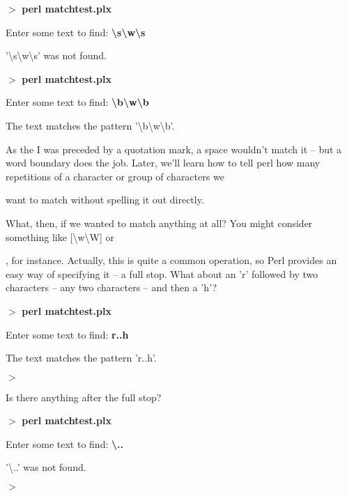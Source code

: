 \documentclass[a4paper,11pt]{book}
\begin{document}
\noindent 

\noindent $>$ \textbf{perl matchtest.plx}

\noindent Enter some text to find: \textbf{\textbackslash s\textbackslash w\textbackslash s}

\noindent '\textbackslash s\textbackslash w\textbackslash s' was not found.

\noindent 

\noindent $>$ \textbf{perl matchtest.plx}

\noindent Enter some text to find: \textbf{\textbackslash b\textbackslash w\textbackslash b}

\noindent The text matches the pattern '\textbackslash b\textbackslash w\textbackslash b'.

\noindent 

\noindent As the I was preceded by a quotation mark, a space wouldn't match it -- but a word boundary does the job. Later, we'll learn how to tell perl how many repetitions of a character or group of characters we

\noindent want to match without spelling it out directly.

\noindent 

\noindent What, then, if we wanted to match anything at all? You might consider something like [\textbackslash w\textbackslash W] or

, for instance. Actually, this is quite a common operation, so Perl provides an easy way of specifying it -- a full stop. What about an 'r' followed by two characters -- any two characters -- and then a 'h'?

\noindent 

\noindent $>$ \textbf{perl matchtest.plx}

\noindent Enter some text to find: \textbf{r..h}

\noindent The text matches the pattern 'r..h'.

\noindent $>$

\noindent 

\noindent Is there anything after the full stop?

\noindent $>$ \textbf{perl matchtest.plx}

\noindent Enter some text to find: \textbf{\textbackslash ..}

\noindent '\textbackslash ..' was not found.

\noindent $>$

\noindent 
\end{document}
